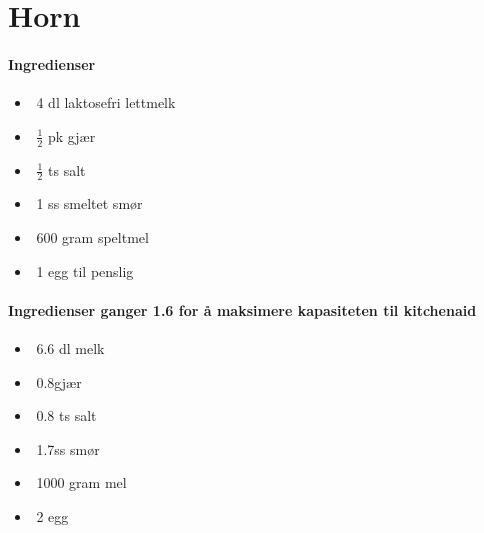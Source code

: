 \section{﻿Horn}


\paragraph{Ingredienser}
\begin{itemize}[noitemsep]
	\item﻿ 4 dl laktosefri lettmelk
	\item﻿ $\frac{1}{2}$ pk gjær
	\item﻿  $\frac{1}{2}$  ts salt
	\item﻿ 1 ss smeltet smør
	\item﻿ 600 gram speltmel
	\item﻿ 1 egg til penslig
\end{itemize}

\paragraph{Ingredienser ganger 1.6 for å maksimere kapasiteten til kitchenaid}
\begin{itemize}[noitemsep]
	\item﻿ 6.6 dl melk
	\item﻿ 0.8gjær
	\item﻿ 0.8 ts salt
	\item﻿ 1.7ss smør
	\item﻿ 1000 gram mel
	\item﻿ 2 egg
\end{itemize}

